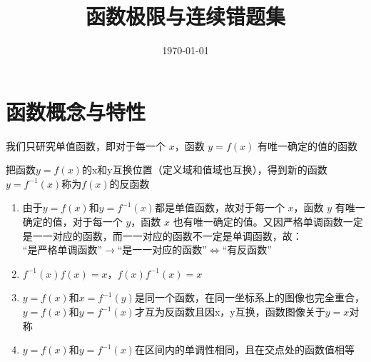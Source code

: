 \documentclass{ctexart}
\title{函数极限与连续错题集}
\date{\today}
\begin{document}
\maketitle

\section{函数概念与特性}

\begin{theorem}[函数]
    我们只研究单值函数，即对于每一个 $x$，函数 $y=f(x)$ 有唯一确定的值的函数
\end{theorem}

\begin{theorem}[反函数]
    把函数$y=f(x)$的x和y互换位置（定义域和值域也互换），得到新的函数$y=f^{-1}(x)$称为$f(x)$的反函数    
    \begin{enumerate}
        \item 由于$y=f(x)$和$y=f^{-1}(x)$都是单值函数，故对于每一个 $x$，函数 $y$ 有唯一确定的值，对于每一个 $y$，函数 $x$ 也有唯一确定的值。又因严格单调函数一定是一一对应的函数，而一一对应的函数不一定是单调函数，故：\\
        “是严格单调函数”$\rightarrow$“是一一对应的函数”$\Leftrightarrow$“有反函数”
        \item $f^{-1}(x)f(x)=x$，$f(x)f^{-1}(x)=x$
        \item $y=f(x)$和$x=f^{-1}(y)$是同一个函数，在同一坐标系上的图像也完全重合，$y=f(x)$和$y=f^{-1}(x)$才互为反函数且因x，y互换，函数图像关于$y=x$对称
        \item $y=f(x)$和$y=f^{-1}(x)$在区间内的单调性相同，且在交点处的函数值相等
    \end{enumerate}
\end{theorem}
\end{document}
